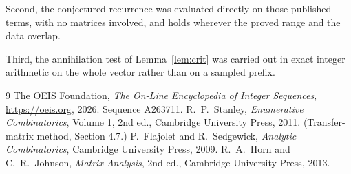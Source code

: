 \documentclass[11pt,a4paper]{article}
\theoremstyle{plain}
\theoremstyle{definition}
\begin{document}
Second, the conjectured recurrence was evaluated directly on those published terms, with no
matrices involved, and holds wherever the proved range and the data overlap.

Third, the annihilation test of Lemma~\ref{lem:crit} was carried out in exact integer
arithmetic on the whole vector rather than on a sampled prefix.

\begin{thebibliography}{9}
 The OEIS Foundation, \emph{The On-Line Encyclopedia of Integer
Sequences}, \url{https://oeis.org}, 2026. Sequence A263711.
 R.~P.~Stanley, \emph{Enumerative Combinatorics}, Volume 1, 2nd ed.,
Cambridge University Press, 2011. (Transfer-matrix method, Section 4.7.)
 P.~Flajolet and R.~Sedgewick, \emph{Analytic Combinatorics}, Cambridge
University Press, 2009.
 R.~A.~Horn and C.~R.~Johnson, \emph{Matrix Analysis}, 2nd ed., Cambridge
University Press, 2013.
\end{thebibliography}
\end{document}
